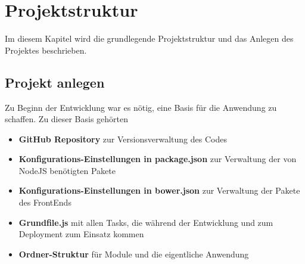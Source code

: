 \chapter {Projektstruktur}
Im diesem Kapitel wird die grundlegende Projektstruktur und das Anlegen des Projektes beschrieben.

\section{Projekt anlegen}
Zu Beginn der Entwicklung war es nötig, eine Basis für die Anwendung zu schaffen. Zu dieser Basis gehörten
\begin{itemize}
\item \textbf{GitHub Repository} zur Versionsverwaltung des Codes
\item \textbf{Konfigurations-Einstellungen in package.json} zur Verwaltung der von NodeJS benötigten Pakete
\item \textbf{Konfigurations-Einstellungen in bower.json} zur Verwaltung der Pakete des FrontEnds
\item \textbf{Grundfile.js} mit allen Tasks, die während der Entwicklung und zum Deployment zum Einsatz kommen
\item \textbf{Ordner-Struktur} für Module und die eigentliche Anwendung
\end{itemize}

